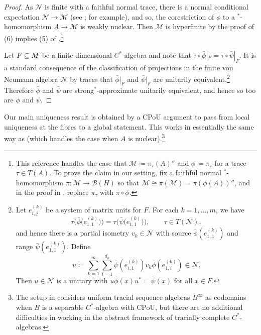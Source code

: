 \documentclass[a4paper,11pt]{amsart}
\theoremstyle{definition}
\numberwithin{equation}{section}
\numberwithin{theorem}{section}
\newcommand{\M}{\mathcal{M}}
\begin{document}
\begin{proof}
	As $\mathcal N$ is finite with a faithful normal trace, there is a normal conditional expectation \mbox{$\mathcal N \rightarrow \mathcal M$} (see \cite[Lemma~1.5.10]{Br08}; for example), and so, the corestriction of $\phi$ to a $^*$-homomorphism $A \rightarrow \mathcal M$ is weakly nuclear.  Then $\M$ is hyperfinite by the proof of (6) implies (5) of \cite[Theorem~3.2.2]{Bro06}.\footnote{This reference handles the case that $\mathcal M \coloneqq \pi_\tau(A)''$ and $\phi \coloneqq \pi_\tau$ for a trace $\tau \in T(A)$.  To prove the claim in our setting, fix a faithful normal $^*$-homomorphism $\pi \colon \mathcal M \rightarrow \mathcal B(H)$ so that $\mathcal M \cong \pi(\mathcal M) = \pi(\phi(A))''$, and in the proof in \cite{Bro06}, replace $\pi_\tau$ with $\pi \circ \phi$.}   
 

 
 Let $F \subseteq \mathcal \M$ be a finite dimensional $C^*$-algebra and note that $\tau\circ\bar\phi|_F=\tau\circ\bar\psi|_F$.  It is a standard consequence of the classification of projections in the finite von Neumann algebra $\mathcal N$ by traces that $\bar\phi|_F$ and $\bar\psi|_F$ are unitarily equivalent.\footnote{\label{fd-unique} 
	Let $e_{i, j}^{(k)}$ be a system of matrix units for $F$.
	For each $k = 1, \ldots, m$, we have
	\begin{equation*}
		\tau\big(\bar\phi\big(e_{1,1}^{(k)}\big)\big) = \tau\big(\bar\psi\big(e_{1, 1}^{(k)}\big)\big), \qquad \tau \in T(\mathcal N),
	\end{equation*}
	and hence there is a partial isometry $v_k \in \mathcal N$ with source $\bar\phi(e_{1,1}^{(k)})$ and range $\bar\psi(e_{1, 1}^{(k)})$.  Define 
	\begin{equation*}
		u \coloneqq \sum_{k = 1}^m \sum_{i = 1}^{d_k} \bar\psi(e_{i, 1}^{(k)})v_k \bar\phi(e_{1, i}^{(k)}) \in \mathcal N. 
	\end{equation*}
	Then $u \in \mathcal N$ is a unitary with $u \bar\phi(x)u^* = \bar\psi(x)$ for all $x \in F$.}
	Therefore $\bar\phi$ and $\bar\psi$ are strong$^*$-approximate unitarily equivalent, and hence so too are $\phi$ and $\psi$.
\end{proof}

Our main uniqueness result is obtained by a CPoU argument to pass from  local uniqueness at the fibres to a global statement.  This works in essentially the same way as \cite[Theorem 2.2]{CETW-classification} (which handles the case when $A$ is nuclear).\footnote{The setup in \cite{CETW-classification} considers uniform tracial sequence algebras $B^\infty$ as codomains when $B$ is a separable $C^*$-algebra with CPoU, but there are no additional difficulties in working in the abstract framework of tracially complete $C^*$-algebras.}
\end{document}
